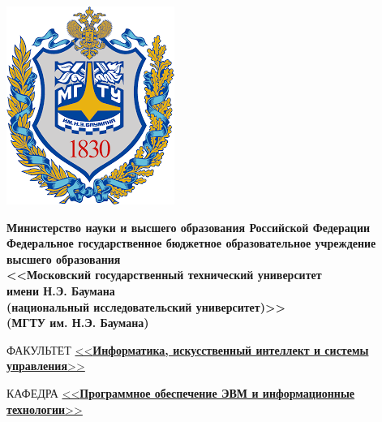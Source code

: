\begin{titlepage}
	\noindent\begin{minipage}{0.05\textwidth}
		\includegraphics[scale=0.3]{b_logo.png}
	\end{minipage}
	\hfill
	\begin{minipage}{0.85\textwidth}\raggedleft
		\begin{center}
			\fontsize{12pt}{0.3\baselineskip}\selectfont \textbf{Министерство науки и высшего образования Российской Федерации \\ Федеральное государственное бюджетное образовательное учреждение \\ высшего образования \\ <<Московский государственный технический университет \\ имени Н.Э. Баумана \\ (национальный исследовательский университет)>> \\ (МГТУ им. Н.Э. Баумана)}
		\end{center}
	\end{minipage}
	
	\begin{center}
		\fontsize{12pt}{0.1\baselineskip}\selectfont
		\noindent\makebox[\linewidth]{\rule{\textwidth}{4pt}} \makebox[\linewidth]{\rule{\textwidth}{1pt}}
	\end{center}
	
	\begin{flushleft}
		\fontsize{12pt}{0.8\baselineskip}\selectfont 
		
		ФАКУЛЬТЕТ \uline{<<\textbf{Информатика, искусственный интеллект и системы управления}>> \hfill}
		
		КАФЕДРА \uline{\mbox{\hspace{4mm}} <<\textbf{Программное обеспечение ЭВМ и информационные технологии}>> \hfill}
	\end{flushleft}
	

\end{titlepage}
